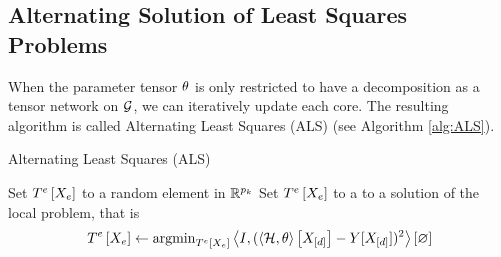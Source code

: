 



\subsection{Alternating Solution of Least Squares Problems}

When the parameter tensor $\theta$ is only restricted to have a decomposition as a tensor network on $\mathcal{G}$, we can iteratively update each core.
The resulting algorithm is called Alternating Least Squares (ALS) (see Algorithm \ref{alg:ALS}).

\begin{algorithm}[hbt!]
\caption{Alternating Least Squares (ALS)}\label{alg:ALS}
\begin{algorithmic}
\For{$\edgein$}
	\State Set $T^{e}\left[X_{e}\right]$ to a random element in $\mathbb{R}^{p_{k}}$ 
\EndFor
{}
\For{$\edgein$}
	\State Set $T^{e}\left[X_{e}\right]$ to a to a solution of the local problem, that is
	\[ 
	T^{e}\left[X_{e}\right]
	 \leftarrow 
	 \mathrm{argmin}_{T^{e}\left[X_{e}\right]} 
	 \left\langle I, (\left\langle \mathcal{H},\theta\right\rangle \left[ X_{[d]} \right] - Y[X_{[d]}])^2\right\rangle \left[ \varnothing \right]
	 \]
\EndFor
\EndWhile
\end{algorithmic}
\end{algorithm}


